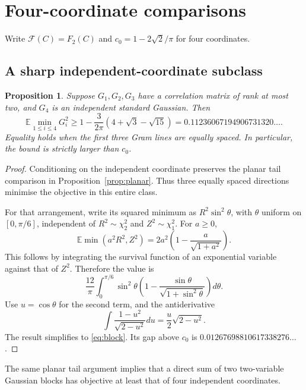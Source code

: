 \documentclass[11pt,a4paper]{article}
\newtheorem{proposition}[theorem]{Proposition}
\theoremstyle{remark}\newtheorem{remark}[theorem]{Remark}
\newcommand{\E}{\mathbb E}
\newcommand{\F}{\mathcal F}
\begin{document}
\section{Four-coordinate comparisons}\label{sec:block}
Write $\F(C)=F_2(C)$ and $c_0=1-2\sqrt2/\pi$ for four coordinates.
\subsection{A sharp independent-coordinate subclass}
\begin{proposition}\label{prop:block}
Suppose $G_1,G_2,G_3$ have a correlation matrix of rank at most two, and $G_4$ is an independent standard Gaussian. Then
\begin{equation}\label{eq:block}
 \E\min_{1\leq i\leq4}G_i^2
 \geq 1-\frac{3}{2\pi}(4+\sqrt3-\sqrt{15})
 =0.11236067194906731320\ldots .
\end{equation}
Equality holds when the first three Gram lines are equally spaced. In particular, the bound is strictly larger than $c_0$.
\end{proposition}
\begin{proof}
Conditioning on the independent coordinate preserves the planar tail comparison in Proposition~\ref{prop:planar}. Thus three equally spaced directions minimise the objective in this entire class.

For that arrangement, write its squared minimum as $R^2\sin^2\theta$, with $\theta$ uniform on $[0,\pi/6]$, independent of $R^2\sim\chi^2_2$ and $Z^2\sim\chi^2_1$. For $a\geq0$,
\[
 \E\min(a^2R^2,Z^2)=2a^2\left(1-\frac{a}{\sqrt{1+a^2}}\right).
\]
This follows by integrating the survival function of an exponential variable against that of $Z^2$. Therefore the value is
\[
 \frac{12}\pi\int_0^{\pi/6}
 \sin^2\theta\left(1-\frac{\sin\theta}{\sqrt{1+\sin^2\theta}}\right)d\theta.
\]
Use $u=\cos\theta$ for the second term, and the antiderivative
\[
 \int\frac{1-u^2}{\sqrt{2-u^2}}du
 =\frac u2\sqrt{2-u^2}.
\]
The result simplifies to \eqref{eq:block}. Its gap above $c_0$ is
$0.01267698810617338276\ldots$.
\end{proof}
The same planar tail argument implies that a direct sum of two two-variable Gaussian blocks has objective at least that of four independent coordinates.
\end{document}
